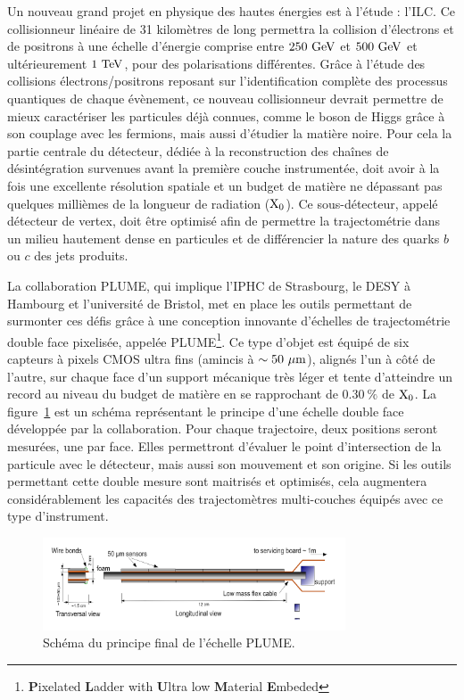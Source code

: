   Un nouveau grand projet en physique des hautes énergies est à l'étude : l'\acrfull{ILC}. 
  Ce collisionneur linéaire de 31 kilomètres de long permettra la collision d'électrons et de positrons à une échelle d'énergie comprise entre $250~\rm{GeV}$ et $500~\rm{GeV}$ et ultérieurement $1~\rm{TeV}$, pour des polarisations différentes.
  Grâce à l'étude des collisions électrons/positrons reposant sur l'identification complète des processus quantiques de chaque évènement, ce nouveau collisionneur devrait permettre de mieux caractériser les particules déjà connues, comme le boson de Higgs grâce à son couplage avec les fermions, mais aussi d'étudier la matière noire.
  Pour cela la partie centrale du détecteur, dédiée à la reconstruction des chaînes de désintégration survenues avant la première couche instrumentée, doit avoir à la fois une excellente résolution spatiale et un budget de matière ne dépassant pas quelques millièmes de la longueur de radiation ($\rm{X_0}$). 
  Ce sous-détecteur, appelé détecteur de vertex, doit être optimisé afin de permettre la trajectométrie dans un milieu hautement dense en particules et de différencier la nature des quarks $b$ ou $c$ des jets produits.

  La collaboration PLUME, qui implique l'IPHC de Strasbourg, le DESY à Hambourg et l'université de Bristol, met en place les outils permettant de surmonter ces défis grâce à une conception innovante d'échelles de trajectométrie double face pixelisée, appelée PLUME\footnote{\textbf{P}ixelated \textbf{L}adder with \textbf{U}ltra low \textbf{M}aterial \textbf{E}mbeded}\cite{PLUME}. 
  Ce type d'objet est équipé de six capteurs à pixels CMOS ultra fins (amincis à $\sim 50~\rm{\mu m}$), alignés l'un à côté de l'autre, sur chaque face d'un support mécanique très léger et tente d'atteindre un record au niveau du budget de matière en se rapprochant de $0.30~\%$ de $\rm{X_0}$.
  La figure~\ref{fig:PLUME_resume} est un schéma représentant le principe d'une échelle double face développée par la collaboration.
  Pour chaque trajectoire, deux positions seront mesurées, une par face. 
  Elles permettront d'évaluer le point d'intersection de la particule avec le détecteur, mais aussi son mouvement et son origine. 
  Si les outils permettant cette double mesure sont maitrisés et optimisés, cela augmentera considérablement les capacités des trajectomètres multi-couches équipés avec ce type d'instrument.

  \begin{figure}
    \centering
    \includegraphics[width = 0.8\textwidth]{Pictures/vxd/plume_finalGoal.png}
    \caption{Schéma du principe final de l'échelle PLUME.}
    \label{fig:PLUME_resume}
  \end{figure}

